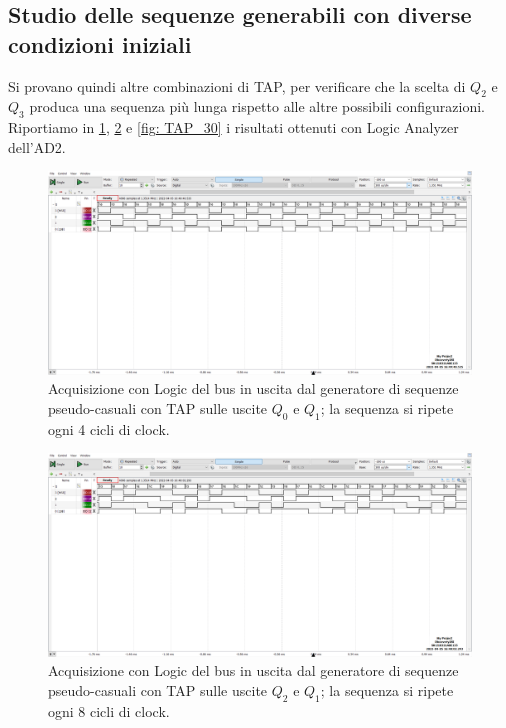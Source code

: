 \documentclass[10pt, a4paper, italian]{article}
\begin{document}
\subsection{Studio delle sequenze generabili con diverse condizioni iniziali}
Si provano quindi altre combinazioni di TAP, per verificare che la scelta di
$Q_2$ e $Q_3$ produca una sequenza più lunga rispetto alle altre possibili
configurazioni. Riportiamo in \cref{fig: TAP_10}, \cref{fig: TAP_21} e
\cref{fig: TAP_30} i risultati ottenuti con Logic Analyzer dell'AD2.
\begin{figure}[htbp]
\centering
	\includegraphics[width=\textwidth]{4.b_10}
	\caption{Acquisizione con Logic del bus in uscita dal generatore di sequenze
	pseudo-casuali con TAP sulle uscite $Q_0$ e $Q_1$; la sequenza si ripete ogni
	4 cicli di clock.
	\label{fig: TAP_10}}
\end{figure}
\begin{figure}[htbp]
\centering
	\includegraphics[width=\textwidth]{4.b_21}
	\caption{Acquisizione con Logic del bus in uscita dal generatore di sequenze
	pseudo-casuali con TAP sulle uscite $Q_2$ e $Q_1$; la sequenza si ripete ogni
	8 cicli di clock.
	\label{fig: TAP_21}}
\end{figure}
\end{document}

